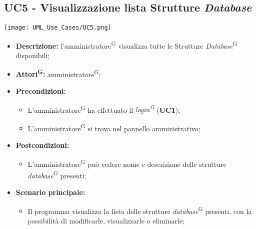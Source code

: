 \subsection{UC5 - Visualizzazione lista Strutture \textit{Database}}
\label{sec:UC5}
\texttt{[image: UML\_Use\_Cases/UC5.png]}
\begin{itemize}
	\item \textbf{Descrizione:} l’amministratore\textsuperscript{G} visualizza tutte le Strutture \textit{Database}\textsuperscript{G} disponibili;
	\item \textbf{Attori\textsuperscript{G}:} amministratore\textsuperscript{G};
	\item \textbf{Precondizioni:} 
	\begin{itemize}
		\item L’amministratore\textsuperscript{G} ha effettuato il \textit{login\textsuperscript{G}} (\hyperref[sec:UC1]{\textbf{UC1}});
		\item L’amministratore\textsuperscript{G} si trova nel pannello amministrativo;
	\end{itemize}
	\item \textbf{Postcondizioni:} 
	\begin{itemize}
		\item L'amministratore\textsuperscript{G} può vedere nome e descrizione delle strutture \textit{database}\textsuperscript{G} presenti;
	\end{itemize}
	\item \textbf{Scenario principale:} 
	\begin{itemize}
		\item Il programma visualizza la lista delle strutture \textit{database}\textsuperscript{G} presenti, con la possibilità di modificarle, visualizzarle o eliminarle;
	\end{itemize}
\end{itemize}


